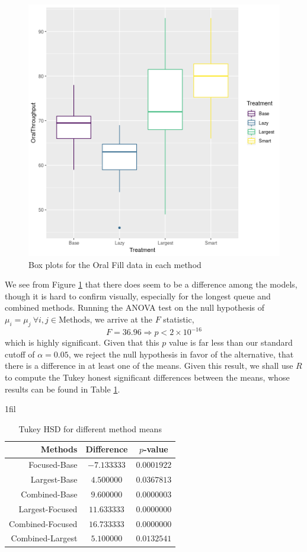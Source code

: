\documentclass[10pt]{report}            %
\makeatletter
\newcommand*{\centerfloat}{%
  \parindent \z@
  \leftskip \z@ \@plus 1fil \@minus \textwidth
  \rightskip\leftskip
  \parfillskip \z@skip}
\makeatother
\begin{document}
\begin{figure}[H]
\centering
\includegraphics[scale=.5]{anovaBox.png}
\caption{Box plots for the Oral Fill data in each method}
\label{fig:anovaBox}
\end{figure}
We see from Figure \ref{fig:anovaBox} that there does seem to be a difference among the models, though it is hard to confirm visually, especially for the longest queue and combined methods. Running the ANOVA test on the null hypothesis of $\mu_i=\mu_j\ \forall i,j\in\text{Methods}$, we arrive at the $F$ statistic, 
\[F=36.96\Rightarrow p<2\times10^{-16}\]
which is highly significant. Given that this $p$ value is far less than our standard cutoff of $\alpha = 0.05$, we reject the null hypothesis in favor of the alternative, that there is a difference in at least one of the means. Given this result, we shall use $R$ to compute the Tukey honest significant differences between the means, whose results can be found in Table \ref{table:tukey}.
\begin{table}[H]
\centerfloat
\begin{tabular}{|r||c|c|}
\hline
Methods & Difference & $p$-value\\\hline\hline
Focused-Base   &  $-7.133333$ & $0.0001922$\\\hline
\cellcolor{yellow!25}Largest-Base  & \cellcolor{yellow!25}$4.500000$ & \cellcolor{yellow!25}$0.0367813$\\\hline
Combined-Base  &   $9.600000$ & $0.0000003$\\\hline
Largest-Focused & $11.633333$ & $0.0000000$\\\hline
Combined-Focused  &  $16.733333$ & $0.0000000$\\\hline
\cellcolor{yellow!25}Combined-Largest & \cellcolor{yellow!25}$5.100000$ & \cellcolor{yellow!25}$0.0132541$\\\hline
\end{tabular}
\caption{Tukey HSD for different method means}
\label{table:tukey}
\end{table}
\end{document}
